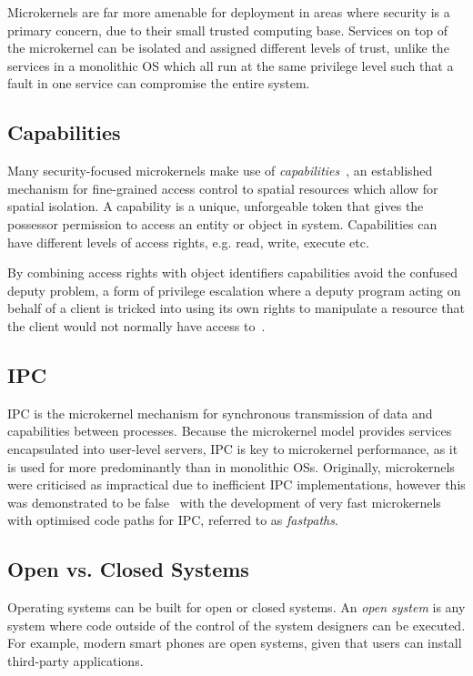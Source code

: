 Microkernels are far more amenable for deployment in areas where security is a primary concern,
due to their small trusted computing base.
Services on top of the microkernel can be isolated and assigned different levels of trust, unlike
the services in a monolithic \gls{OS} which all run at the same privilege level such that a fault in
one service can compromise the entire system. 

\subsection{Capabilities}

Many security-focused microkernels make use of \emph{capabilities}~\citep{Dennis_VanHorn_66}, an
established mechanism for fine-grained access control to spatial resources which allow for spatial
    isolation. A capability is a unique, unforgeable token that gives the possessor permission to access
an entity or object in system. Capabilities can have different levels of access rights, e.g. read,
write, execute etc. 

By combining access rights with object identifiers capabilities avoid the
confused deputy problem, a form of privilege escalation where a deputy program
acting on behalf of a client is  tricked into using
its own rights to manipulate a resource that the client would not normally have access
to~\citep{Hardy_88}. 

\subsection{IPC}

\gls{IPC} is the microkernel mechanism for synchronous transmission of data and capabilities between
processes. Because the microkernel model provides services encapsulated into user-level servers,
\gls{IPC} is key to microkernel performance, as it is used for more predominantly than in monolithic
\glspl{OS}. Originally, microkernels were criticised as impractical due to inefficient IPC
implementations, however this was demonstrated to be false~\citep{Hartig_HLSW_97} with the
development of very fast microkernels with optimised code paths for IPC, referred to as \emph{fastpaths}. 


\subsection{Open vs. Closed Systems}

Operating systems can be built for open or closed systems.  An \emph{open system} is any system
where code outside of the control of the system designers can be executed. For example, modern
smart phones are open systems, given that users can install third-party applications.

